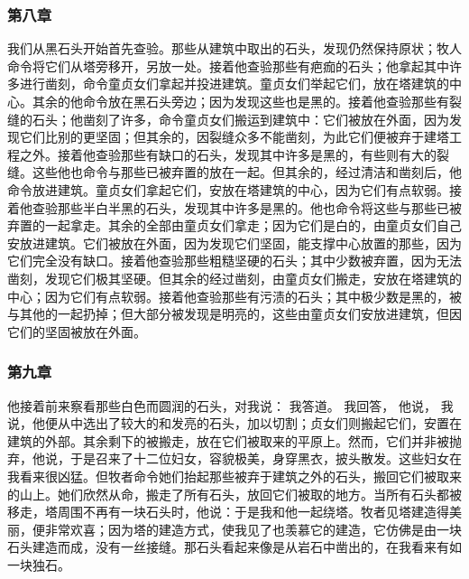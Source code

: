 
\subsubsection{第八章}

我们从黑石头开始首先查验。那些从建筑中取出的石头，发现仍然保持原状；牧人命令将它们从塔旁移开，另放一处。接着他查验那些有疤痂的石头；他拿起其中许多进行凿刻，命令童贞女们拿起并投进建筑。童贞女们举起它们，放在塔建筑的中心。其余的他命令放在黑石头旁边；因为发现这些也是黑的。接着他查验那些有裂缝的石头；他凿刻了许多，命令童贞女们搬运到建筑中：它们被放在外面，因为发现它们比别的更坚固；但其余的，因裂缝众多不能凿刻，为此它们便被弃于建塔工程之外。接着他查验那些有缺口的石头，发现其中许多是黑的，有些则有大的裂缝。这些他也命令与那些已被弃置的放在一起。但其余的，经过清洁和凿刻后，他命令放进建筑。童贞女们拿起它们，安放在塔建筑的中心，因为它们有点软弱。接着他查验那些半白半黑的石头，发现其中许多是黑的。他也命令将这些与那些已被弃置的一起拿走。其余的全部由童贞女们拿走；因为它们是白的，由童贞女们自己安放进建筑。它们被放在外面，因为发现它们坚固，能支撑中心放置的那些，因为它们完全没有缺口。接着他查验那些粗糙坚硬的石头；其中少数被弃置，因为无法凿刻，发现它们极其坚硬。但其余的经过凿刻，由童贞女们搬走，安放在塔建筑的中心；因为它们有点软弱。接着他查验那些有污渍的石头；其中极少数是黑的，被与其他的一起扔掉；但大部分被发现是明亮的，这些由童贞女们安放进建筑，但因它们的坚固被放在外面。\par


\subsubsection{第九章}

他接着前来察看那些白色而圆润的石头，对我说： 我答道。 我回答， 他说， 我说，他便从中选出了较大的和发亮的石头，加以切割；贞女们则搬起它们，安置在建筑的外部。其余剩下的被搬走，放在它们被取来的平原上。然而，它们并非被抛弃，他说，于是召来了十二位妇女，容貌极美，身穿黑衣，披头散发。这些妇女在我看来很凶猛。但牧者命令她们抬起那些被弃于建筑之外的石头，搬回它们被取来的山上。她们欣然从命，搬走了所有石头，放回它们被取的地方。当所有石头都被移走，塔周围不再有一块石头时，他说：于是我和他一起绕塔。牧者见塔建造得美丽，便非常欢喜；因为塔的建造方式，使我见了也羡慕它的建造，它仿佛是由一块石头建造而成，没有一丝接缝。那石头看起来像是从岩石中凿出的，在我看来有如一块独石。\par

